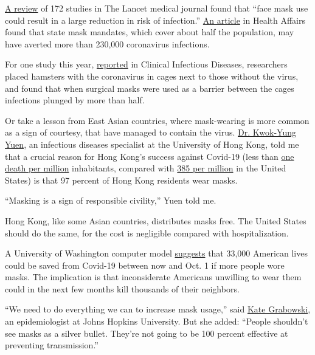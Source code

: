 \href{https://www.thelancet.com/journals/lancet/article/PIIS0140-6736(20)31142-9/fulltext\#\%20}{A
review} of 172 studies in The Lancet medical journal found that ``face
mask use could result in a large reduction in risk of infection.''
\href{https://www.healthaffairs.org/doi/10.1377/hlthaff.2020.00818}{An
article} in Health Affairs found that state mask mandates, which cover
about half the population, may have averted more than 230,000
coronavirus infections.

For one study this year,
\href{https://www.researchgate.net/publication/341779100_Surgical_mask_partition_reduces_the_risk_of_non-contact_transmission_in_a_golden_Syrian_hamster_model_for_Coronavirus_Disease_2019_COVID-19}{reported}
in Clinical Infectious Diseases, researchers placed hamsters with the
coronavirus in cages next to those without the virus, and found that
when surgical masks were used as a barrier between the cages infections
plunged by more than half.

Or take a lesson from East Asian countries, where mask-wearing is more
common as a sign of courtesy, that have managed to contain the virus.
\href{http://www.microbiology.hku.hk/02_HKU_Staff_Prof_KY_Yuen.html}{Dr.
Kwok-Yung Yuen}, an infectious diseases specialist at the University of
Hong Kong, told me that a crucial reason for Hong Kong's success against
Covid-19 (less than
\href{https://www.worldometers.info/coronavirus/country/china-hong-kong-sar/}{one
death per million} inhabitants, compared with
\href{https://ourworldindata.org/grapher/total-covid-deaths-per-million}{385
per million} in the United States) is that 97 percent of Hong Kong
residents wear masks.

``Masking is a sign of responsible civility,'' Yuen told me.

Hong Kong, like some Asian countries, distributes masks free. The United
States should do the same, for the cost is negligible compared with
hospitalization.

A University of Washington computer model
\href{http://www.healthdata.org/news-release/new-ihme-covid-19-model-projects-nearly-180000-us-deaths}{suggests}
that 33,000 American lives could be saved from Covid-19 between now and
Oct. 1 if more people wore masks. The implication is that inconsiderate
Americans unwilling to wear them could in the next few months kill
thousands of their neighbors.

``We need to do everything we can to increase mask usage,'' said
\href{https://www.jhsph.edu/faculty/directory/profile/3094/mary-kathryn-grabowski}{Kate
Grabowski}, an epidemiologist at Johns Hopkins University. But she
added: ``People shouldn't see masks as a silver bullet. They're not
going to be 100 percent effective at preventing transmission.''

